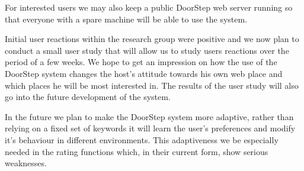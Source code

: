 \documentclass[a4paper,twoside]{danarticle}
\theoremstyle{remark}
\begin{document}
    For interested users we may also keep a public DoorStep web server running
    so that everyone with a spare machine will be able to use the system.
    
    Initial user reactions within the research group were positive and we now
    plan to conduct a small user study that will allow us to study users
    reactions over the period of a few weeks. We hope to get an impression on how
    the use of the DoorStep system changes the host's attitude towards his own
    web place and which places he will be most interested in. The results of the
    user study will also go into the future development of the system.
    
    In the future we plan to make the DoorStep system more adaptive,
    rather than relying on a fixed set of keywords it will learn the user's
    preferences and modify it's behaviour in different environments. This
    adaptiveness we be especially needed in the rating functions which, in their
    current form, show serious weaknesses.
    
\end{document}

